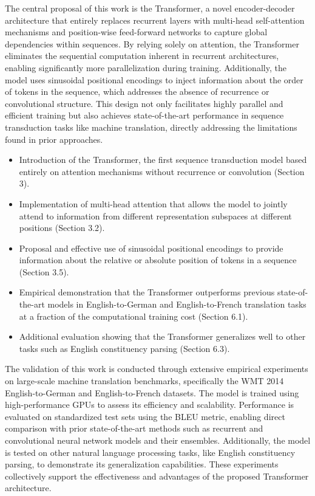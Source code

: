 \documentclass[journal]{IEEEtran}
\begin{document}
The central proposal of this work is the Transformer, a novel encoder-decoder architecture that entirely replaces recurrent layers with multi-head self-attention mechanisms and position-wise feed-forward networks to capture global dependencies within sequences. By relying solely on attention, the Transformer eliminates the sequential computation inherent in recurrent architectures, enabling significantly more parallelization during training. Additionally, the model uses sinusoidal positional encodings to inject information about the order of tokens in the sequence, which addresses the absence of recurrence or convolutional structure. This design not only facilitates highly parallel and efficient training but also achieves state-of-the-art performance in sequence transduction tasks like machine translation, directly addressing the limitations found in prior approaches.

\begin{itemize}
  \item Introduction of the Transformer, the first sequence transduction model based entirely on attention mechanisms without recurrence or convolution (Section 3).
  \item Implementation of multi-head attention that allows the model to jointly attend to information from different representation subspaces at different positions (Section 3.2).
  \item Proposal and effective use of sinusoidal positional encodings to provide information about the relative or absolute position of tokens in a sequence (Section 3.5).
  \item Empirical demonstration that the Transformer outperforms previous state-of-the-art models in English-to-German and English-to-French translation tasks at a fraction of the computational training cost (Section 6.1).
  \item Additional evaluation showing that the Transformer generalizes well to other tasks such as English constituency parsing (Section 6.3).
\end{itemize}

The validation of this work is conducted through extensive empirical experiments on large-scale machine translation benchmarks, specifically the WMT 2014 English-to-German and English-to-French datasets. The model is trained using high-performance GPUs to assess its efficiency and scalability. Performance is evaluated on standardized test sets using the BLEU metric, enabling direct comparison with prior state-of-the-art methods such as recurrent and convolutional neural network models and their ensembles. Additionally, the model is tested on other natural language processing tasks, like English constituency parsing, to demonstrate its generalization capabilities. These experiments collectively support the effectiveness and advantages of the proposed Transformer architecture.
\end{document}
